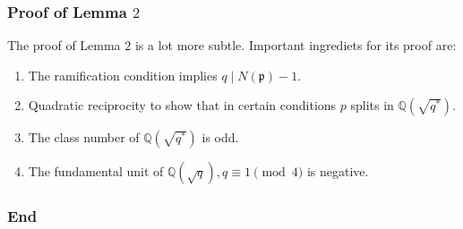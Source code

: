 \documentclass{beamer}
\newcommand{\QQ}{\mathbb{Q}}
\newcommand{\pp}{\mathfrak{p}}
\theoremstyle{plain}
\begin{document}
\begin{frame}
    \frametitle{Proof of Lemma $2$}
    The proof of Lemma $2$ is a lot more subtle. Important ingrediets for its proof are:
    \begin{enumerate}
        \item The ramification condition implies $q\mid N(\pp)-1$.
        \item Quadratic reciprocity to show that in certain conditions $p$ splits in $\QQ(\sqrt{q^*})$.
        \item The class number of $\QQ(\sqrt{q^*})$ is odd.
        \item The fundamental unit of $\QQ(\sqrt{q}), q\equiv1\pmod{4}$ is negative.
    \end{enumerate}
\end{frame}






\begin{frame}
    \frametitle{End}

    

\end{frame}
\end{document}
